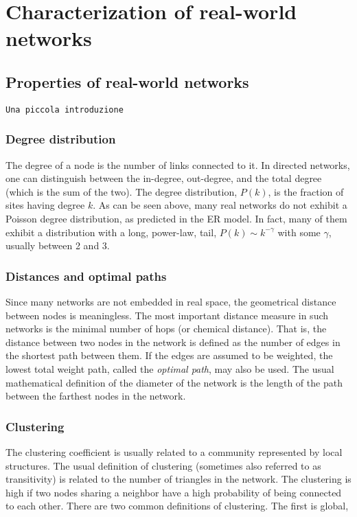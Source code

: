\clearpage
\section{Characterization of real-world networks}


\subsection{Properties of real-world networks}

\texttt{Una piccola introduzione}

\subsubsection{Degree distribution}

\nd The degree of a node is the number of links connected to it. In directed networks, one can distinguish between the in-degree, out-degree, and the total degree (which is the sum of the two). The degree distribution, $P(k)$, is the fraction of sites having degree $k$. As can be seen above, many real networks do not exhibit a Poisson degree
distribution, as predicted in the ER model. In fact, many of them exhibit a distribution with a long, power-law, tail, $P(k) \sim k^{-\gamma}$ with some $\gamma$, usually between 2 and 3.

\subsubsection{Distances and optimal paths}

\nd Since many networks are not embedded in real space, the geometrical distance between nodes is meaningless. The most important distance measure in such networks is the minimal number of hops (or chemical distance). That is, the distance between two nodes in the network is defined as the number of edges in the shortest path between them. If the edges are assumed to be weighted, the lowest total weight path, called the \emph{optimal path}, may also be used. The usual mathematical definition of the diameter of the network is the length of the path between the farthest nodes in
the network.

\subsubsection{Clustering}

\nd The clustering coefficient is usually related to a community represented by local structures. The usual definition of clustering (sometimes also referred to as transitivity) is related to the number of triangles in the network. The clustering is high if two nodes sharing a neighbor have a high probability of being connected to each other. There are two common definitions of clustering. The first is global,

